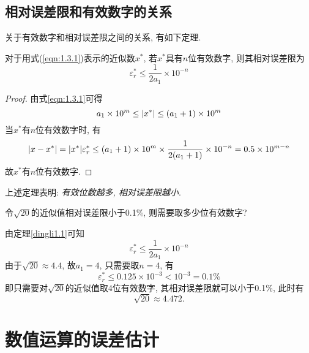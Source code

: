 \subsection{相对误差限和有效数字的关系}

关于有效数字和相对误差限之间的关系, 有如下定理.
\begin{theorem}\label{dingli1.1}
    对于用式(\ref{eqn:1.3.1})表示的近似数$x^*$, 若$x^*$具有$n$位有效数字, 则其相对误差限为
    \begin{equation*}
        \varepsilon_r^*\le\frac{1}{2a_1}\times10^{-n}
    \end{equation*}
\end{theorem}

\begin{proof}
    由式\ref{eqn:1.3.1}可得
    \begin{equation*}
        a_1\times10^m\le\abs{x^*}\le(a_1+1)\times10^m
    \end{equation*}
    当$x^*$有$n$位有效数字时, 有
    \begin{equation*}
        \abs{x-x^*}=\abs{x^*}\varepsilon_r^*\le(a_1+1)\times10^m\times\frac{1}{2(a_1+1)}\times10^{-n}=0.5\times10^{m-n}
    \end{equation*}
    故$x^*$有$n$位有效数字.
\end{proof}

上述定理表明: \emph{有效位数越多, 相对误差限越小}.

\begin{example}
    令$\sqrt{20}$的近似值相对误差限小于0.1\%, 则需要取多少位有效数字?
\end{example}
\begin{solution}
    由定理\ref{dingli1.1}可知
    \begin{equation*}
        \varepsilon_r^*\le\frac{1}{2a_1}\times10^{-n}
    \end{equation*}
    由于$\sqrt{20}\approx4.4$, 故$a_1=4$, 只需要取$n=4$, 有
    \begin{equation*}
        \varepsilon_r^*\le0.125\times10^{-3}<10^{-3}=0.1\%
    \end{equation*}
    即只需要对$\sqrt{20}$的近似值取4位有效数字, 其相对误差限就可以小于0.1\%, 此时有
    \begin{equation*}
        \sqrt{20}\approx4.472.
    \end{equation*}
\end{solution}

\section{数值运算的误差估计}

